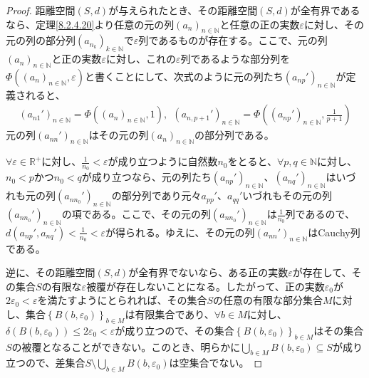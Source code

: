 \documentclass[dvipdfmx]{jsarticle}
\begin{document}
\begin{proof}
距離空間$(S,d)$が与えられたとき、その距離空間$(S,d)$が全有界であるなら、定理\ref{8.2.4.20}より任意の元の列$\left( a_{n} \right)_{n \in \mathbb{N}}$と任意の正の実数$\varepsilon$に対し、その元の列の部分列$\left( a_{n_{k}} \right)_{k \in \mathbb{N}}$で$\varepsilon$列であるものが存在する。ここで、元の列$\left( a_{n} \right)_{n \in \mathbb{N}}$と正の実数$\varepsilon$に対し、これの$\varepsilon$列であるような部分列を$\varPhi\left( \left( a_{n} \right)_{n \in \mathbb{N}},\varepsilon \right)$と書くことにして、次式のように元の列たち$\left( a_{np}' \right)_{n \in \mathbb{N}}$が定義されると、
\begin{align*}
\left( a_{n1}' \right)_{n \in \mathbb{N}} = \varPhi\left( \left( a_{n} \right)_{n \in \mathbb{N}},1 \right),\ \ \left( a_{n,p + 1}' \right)_{n \in \mathbb{N}} = \varPhi\left( \left( a_{np}' \right)_{n \in \mathbb{N}},\frac{1}{p + 1} \right)
\end{align*}
元の列$\left( a_{nn}' \right)_{n \in \mathbb{N}}$はその元の列$\left( a_{n} \right)_{n \in \mathbb{N}}$の部分列である。\par
$\forall\varepsilon \in \mathbb{R}^{+}$に対し、$\frac{1}{n_{0}} < \varepsilon$が成り立つように自然数$n_{0}$をとると、$\forall p,q \in \mathbb{N}$に対し、$n_{0} < p$かつ$n_{0} < q$が成り立つなら、元の列たち$\left( a_{np}' \right)_{n \in \mathbb{N}}$、$\left( a_{nq}' \right)_{n \in \mathbb{N}}$はいづれも元の列$\left( a_{nn_{0}}' \right)_{n \in \mathbb{N}}$の部分列であり元々$a_{pp}'$、$a_{qq}'$いづれもその元の列$\left( a_{nn_{0}}' \right)_{n \in \mathbb{N}}$の項である。ここで、その元の列$\left( a_{nn_{0}}' \right)_{n \in \mathbb{N}}$は$\frac{1}{n_{0}}$列であるので、$d\left( a_{np}',a_{nq}' \right) < \frac{1}{n_{0}} < \varepsilon$が得られる。ゆえに、その元の列$\left( a_{nn}' \right)_{n \in \mathbb{N}}$はCauchy列である。\par
逆に、その距離空間$(S,d)$が全有界でないなら、ある正の実数$\varepsilon$が存在して、その集合$S$の有限な$\varepsilon$被覆が存在しないことになる。したがって、正の実数$\varepsilon_{0}$が$2\varepsilon_{0} < \varepsilon$を満たすようにとられれば、その集合$S$の任意の有限な部分集合$M$に対し、集合$\left\{ B\left( b,\varepsilon_{0} \right) \right\}_{b \in M}$は有限集合であり、$\forall b \in M$に対し、$\delta\left( B\left( b,\varepsilon_{0} \right) \right) \leq 2\varepsilon_{0} < \varepsilon$が成り立つので、その集合$\left\{ B\left( b,\varepsilon_{0} \right) \right\}_{b \in M}$はその集合$S$の被覆となることができない。このとき、明らかに$\bigcup_{b \in M} {B\left( b,\varepsilon_{0} \right)} \subseteq S$が成り立つので、差集合$S \setminus \bigcup_{b \in M} {B\left( b,\varepsilon_{0} \right)}$は空集合でない。\par

\end{proof}
\end{document}

